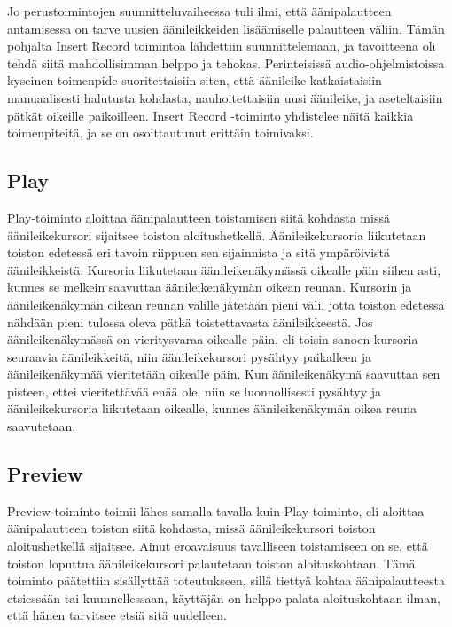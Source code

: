 \documentclass[utf8]{gradu3}
\begin{document}
Jo perustoimintojen suunnitteluvaiheessa tuli ilmi, että äänipalautteen antamisessa on tarve uusien äänileikkeiden lisäämiselle palautteen väliin. Tämän pohjalta Insert Record toimintoa lähdettiin suunnittelemaan, ja tavoitteena oli tehdä siitä mahdollisimman helppo ja tehokas. Perinteisissä audio-ohjelmistoissa kyseinen toimenpide suoritettaisiin siten, että äänileike katkaistaisiin manuaalisesti halutusta kohdasta, nauhoitettaisiin uusi äänileike, ja aseteltaisiin pätkät oikeille paikoilleen. Insert Record -toiminto yhdistelee näitä kaikkia toimenpiteitä, ja se on osoittautunut erittäin toimivaksi.

\subsection{Play}

Play-toiminto aloittaa äänipalautteen toistamisen siitä kohdasta missä äänileikekursori sijaitsee toiston aloitushetkellä. Äänileikekursoria liikutetaan toiston edetessä eri tavoin riippuen sen sijainnista ja sitä ympäröivistä äänileikkeistä. Kursoria liikutetaan äänileikenäkymässä oikealle päin siihen asti, kunnes se melkein saavuttaa äänileikenäkymän oikean reunan. Kursorin ja äänileikenäkymän oikean reunan välille jätetään pieni väli, jotta toiston edetessä nähdään pieni tulossa oleva pätkä toistettavasta äänileikkeestä. Jos äänileikenäkymässä on vieritysvaraa oikealle päin, eli toisin sanoen kursoria seuraavia äänileikkeitä, niin äänileikekursori pysähtyy paikalleen ja äänileikenäkymää vieritetään oikealle päin. Kun äänileikenäkymä saavuttaa sen pisteen, ettei vieritettävää enää ole, niin se luonnollisesti pysähtyy ja äänileikekursoria liikutetaan oikealle, kunnes äänileikenäkymän oikea reuna saavutetaan.
 

\subsection{Preview}

Preview-toiminto toimii lähes samalla tavalla kuin Play-toiminto, eli aloittaa äänipalautteen toiston siitä kohdasta, missä äänileikekursori toiston aloitushetkellä sijaitsee. Ainut eroavaisuus tavalliseen toistamiseen on se, että toiston loputtua äänileikekursori palautetaan toiston aloituskohtaan. Tämä toiminto päätettiin sisällyttää toteutukseen, sillä tiettyä kohtaa äänipalautteesta etsiessään tai kuunnellessaan, käyttäjän on helppo palata aloituskohtaan ilman, että hänen tarvitsee etsiä sitä uudelleen.
\end{document}
